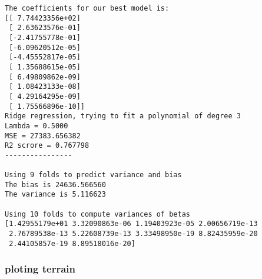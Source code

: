 \documentclass[11pt]{article}
\begin{document}
    \begin{Verbatim}[commandchars=\\\{\}]
The coefficients for our best model is:
[[ 7.74423356e+02]
 [ 2.63623576e-01]
 [-2.41755778e-01]
 [-6.09620512e-05]
 [-4.45552817e-05]
 [ 1.35688615e-05]
 [ 6.49809862e-09]
 [ 1.08423133e-08]
 [ 4.29164295e-09]
 [ 1.75566896e-10]]
Ridge regression, trying to fit a polynomial of degree 3 
Lambda = 0.5000
MSE = 27383.656382
R2 scrore = 0.767798
----------------

Using 9 folds to predict variance and bias
The bias is 24636.566560
The variance is 5.116623

Using 10 folds to compute variances of betas
[1.42955179e+01 3.32090863e-06 1.19403923e-05 2.00656719e-13
 2.76789538e-13 5.22608739e-13 3.33498950e-19 8.82435959e-20
 2.44105857e-19 8.89518016e-20]

    \end{Verbatim}

    \subsubsection{ploting terrain}\label{ploting-terrain}
\end{document}
